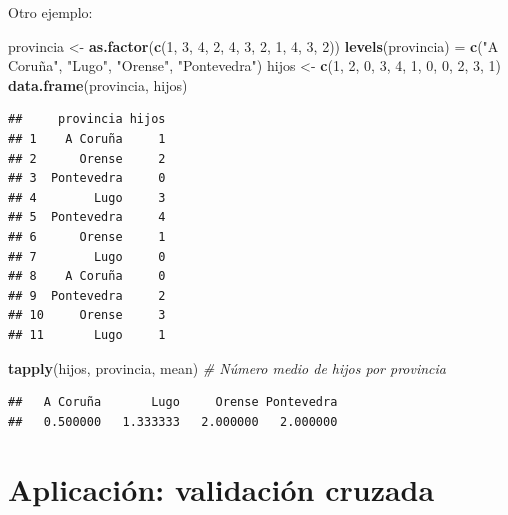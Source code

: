 \documentclass[]{book}
\newenvironment{Shaded}{\begin{snugshade}}{\end{snugshade}}
\newcommand{\CommentTok}[1]{\textcolor[rgb]{0.56,0.35,0.01}{\textit{#1}}}
\newcommand{\DecValTok}[1]{\textcolor[rgb]{0.00,0.00,0.81}{#1}}
\newcommand{\KeywordTok}[1]{\textcolor[rgb]{0.13,0.29,0.53}{\textbf{#1}}}
\newcommand{\NormalTok}[1]{#1}
\newcommand{\StringTok}[1]{\textcolor[rgb]{0.31,0.60,0.02}{#1}}
\begin{document}
Otro ejemplo:

\begin{Shaded}
\begin{Highlighting}[]
\NormalTok{provincia <-}\StringTok{ }\KeywordTok{as.factor}\NormalTok{(}\KeywordTok{c}\NormalTok{(}\DecValTok{1}\NormalTok{, }\DecValTok{3}\NormalTok{, }\DecValTok{4}\NormalTok{, }\DecValTok{2}\NormalTok{, }\DecValTok{4}\NormalTok{, }\DecValTok{3}\NormalTok{, }\DecValTok{2}\NormalTok{, }\DecValTok{1}\NormalTok{, }\DecValTok{4}\NormalTok{, }\DecValTok{3}\NormalTok{, }\DecValTok{2}\NormalTok{))}
\KeywordTok{levels}\NormalTok{(provincia) =}\StringTok{ }\KeywordTok{c}\NormalTok{(}\StringTok{"A Coruña"}\NormalTok{, }\StringTok{"Lugo"}\NormalTok{, }\StringTok{"Orense"}\NormalTok{, }\StringTok{"Pontevedra"}\NormalTok{)}
\NormalTok{hijos <-}\StringTok{ }\KeywordTok{c}\NormalTok{(}\DecValTok{1}\NormalTok{, }\DecValTok{2}\NormalTok{, }\DecValTok{0}\NormalTok{, }\DecValTok{3}\NormalTok{, }\DecValTok{4}\NormalTok{, }\DecValTok{1}\NormalTok{, }\DecValTok{0}\NormalTok{, }\DecValTok{0}\NormalTok{, }\DecValTok{2}\NormalTok{, }\DecValTok{3}\NormalTok{, }\DecValTok{1}\NormalTok{)}
\KeywordTok{data.frame}\NormalTok{(provincia, hijos)}
\end{Highlighting}
\end{Shaded}

\begin{verbatim}
##     provincia hijos
## 1    A Coruña     1
## 2      Orense     2
## 3  Pontevedra     0
## 4        Lugo     3
## 5  Pontevedra     4
## 6      Orense     1
## 7        Lugo     0
## 8    A Coruña     0
## 9  Pontevedra     2
## 10     Orense     3
## 11       Lugo     1
\end{verbatim}

\begin{Shaded}
\begin{Highlighting}[]
\KeywordTok{tapply}\NormalTok{(hijos, provincia, mean) }\CommentTok{# Número medio de hijos por provincia}
\end{Highlighting}
\end{Shaded}

\begin{verbatim}
##   A Coruña       Lugo     Orense Pontevedra 
##   0.500000   1.333333   2.000000   2.000000
\end{verbatim}

\hypertarget{aplicacion-validacion-cruzada}{%
\section{Aplicación: validación cruzada}\label{aplicacion-validacion-cruzada}}
\end{document}
